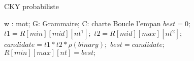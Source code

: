 \documentclass{article}
\begin{document}
\begin{algorithm}
\caption{CKY probabiliste}
\label{cky}
	\begin{algorithmic}
		 \Comment w : mot; G: Grammaire; C: charte
			 \Comment Boucle  l'empan
						\State $best = 0;$
								\State $t1 = R[min][mid][nt^1];$ 
								\State $t2 = R[mid][max][nt^2];$
								\State $candidate = t1 * t2 * \rho(binary);$
									\State $best = candidate;$
								\EndIf
							\EndFor
						\EndFor
						\State $R[min][max][nt] = best;$
					\EndFor
				\EndFor
			\EndFor
		\EndFunction
	\end{algorithmic}
\end{algorithm}
\end{document}
